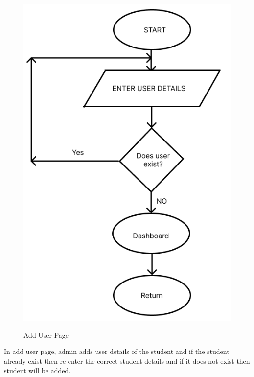 \begin{figure}[H]
    \centering
    \includegraphics[scale=0.4]{images/user_flowchart.png}\\[0.5cm]
    \caption{Add User Page}
    \label{fig:my_label}
\end{figure}

\noindent
In add user page, admin adds user details of the student and if the student already exist then re-enter the correct student details and if it does not exist then student will be added.

